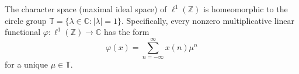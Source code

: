 The character space (maximal ideal space) of $\ell^1(\mathbb{Z})$ is homeomorphic to the circle group $\mathbb{T} = \{\lambda \in \mathbb{C} : |\lambda| = 1\}$. Specifically, every nonzero multiplicative linear functional $\varphi: \ell^1(\mathbb{Z}) \to \mathbb{C}$ has the form
$$\varphi(x) = \sum_{n=-\infty}^{\infty} x(n) \mu^n$$
for a unique $\mu \in \mathbb{T}$.
